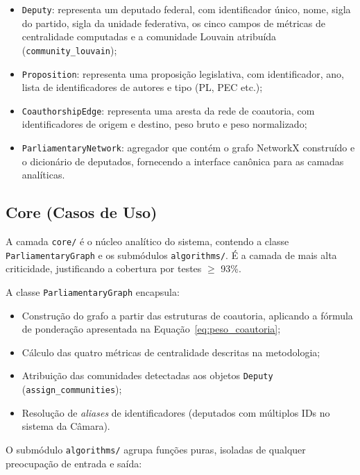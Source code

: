 \documentclass[
      12pt,
      a4paper,
      openright,
      oneside,
      chapter=TITLE,
      section=TITLE,
      english,
      french,
      spanish,
      brazilian
    ]{abntex2}
\begin{document}
    \begin{itemize}
        \item \texttt{Deputy}: representa um deputado federal, com identificador único, nome, sigla do partido, sigla da unidade federativa, os cinco campos de métricas de centralidade computadas e a comunidade Louvain atribuída (\texttt{community\_louvain});
        \item \texttt{Proposition}: representa uma proposição legislativa, com identificador, ano, lista de identificadores de autores e tipo (PL, PEC etc.);
        \item \texttt{CoauthorshipEdge}: representa uma aresta da rede de coautoria, com identificadores de origem e destino, peso bruto e peso normalizado;
        \item \texttt{ParliamentaryNetwork}: agregador que contém o grafo NetworkX construído e o dicionário de deputados, fornecendo a interface canônica para as camadas analíticas.
    \end{itemize}
    
    \subsection{Core (Casos de Uso)}
    
    A camada \texttt{core/} é o núcleo analítico do sistema, contendo a classe \texttt{ParliamentaryGraph} e os submódulos \texttt{algorithms/}. É a camada de mais alta criticidade, justificando a cobertura por testes $\geq$ 93\%.
    
    A classe \texttt{ParliamentaryGraph} encapsula:
    
    \begin{itemize}
        \item Construção do grafo a partir das estruturas de coautoria, aplicando a fórmula de ponderação apresentada na Equação~\ref{eq:peso_coautoria};
        \item Cálculo das quatro métricas de centralidade descritas na metodologia;
        \item Atribuição das comunidades detectadas aos objetos \texttt{Deputy} (\texttt{assign\_communities});
        \item Resolução de \textit{aliases} de identificadores (deputados com múltiplos IDs no sistema da Câmara).
    \end{itemize}
    
    O submódulo \texttt{algorithms/} agrupa funções puras, isoladas de qualquer preocupação de entrada e saída:
    
\end{document}
